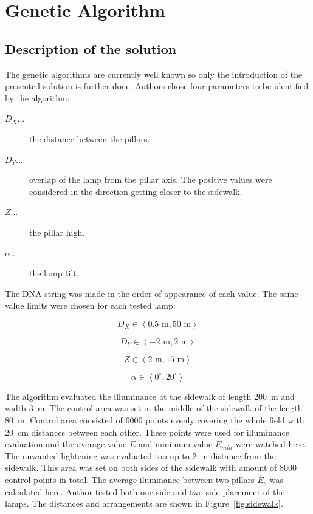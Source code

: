 \section{Genetic Algorithm}
\subsection{Description of the solution}
The genetic algorithms are currently well known so only the introduction of the presented solution is further done. Authors chose four parameters to be identified by the algorithm:

\begin{description}
	\item [$D_X$...] the distance between the pillars.
	\item [$D_Y$...] overlap of the lamp from the pillar axis. The positive values were considered in the direction getting closer to the sidewalk.
	\item [$Z$...] the pillar high.
	\item [$\alpha$...] the lamp tilt.
\end{description}

The DNA string was made in the order of appearance of each value. The same value limits were chosen for each tested lamp:

\begin{equation}
D_X \in \left\langle 0.5 \text{ m}, 50 \text{ m}\right\rangle
\end{equation}

\begin{equation}
D_Y \in \left\langle -2 \text{ m}, 2 \text{ m}\right\rangle
\end{equation}

\begin{equation}
Z \in \left\langle 2 \text{ m}, 15 \text{ m}\right\rangle
\end{equation}

\begin{equation}
\alpha \in \left\langle 0^\circ, 20^\circ \right\rangle
\end{equation}

The algorithm evaluated the illuminance at the sidewalk of length 200~m and width 3~m. The control area was set in the middle of the sidewalk of the length 80~m. Control area consisted of 6000 points evenly covering the whole field with 20~cm distances between each other. These points were used for illuminance evaluation and the average value $\overline{E}$ and minimum value $E_{min}$ were watched here. The unwanted lightening was evaluated too up to 2~m distance from the sidewalk. This area was set on both sides of the sidewalk with amount of 8000 control points in total. The average iluminance between two pillars $\overline{E}_o$ was calculated here. Author tested both one side and two side placement of the lamps. The distances and arrangements are shown in Figure~\ref{fig:sidewalk}.

